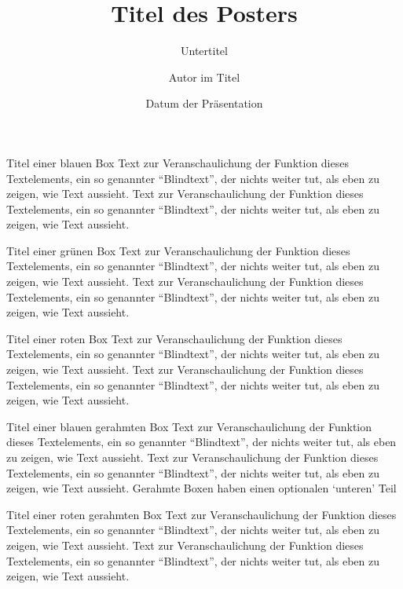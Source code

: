 \documentclass[naustrian,portrait]{univie-ling-poster}
\author[Autor in Fußzeile]{Autor im Titel}
\title{Titel des Posters}
\subtitle{Untertitel}
\date{Datum der Präsentation}
\begin{document}
\begin{frame}

\begin{bluebox}{Titel einer blauen Box}
	Text zur Veranschaulichung der Funktion dieses Textelements, ein so
	genannter \enquote{Blindtext}, der nichts weiter tut, als eben zu zeigen,
	wie Text aussieht. Text zur Veranschaulichung der Funktion dieses Textelements, ein so
	genannter \enquote{Blindtext}, der nichts weiter tut, als eben zu zeigen,
	wie Text aussieht.
\end{bluebox}

\begin{greenbox}{Titel einer grünen Box}
	Text zur Veranschaulichung der Funktion dieses Textelements, ein so
	genannter \enquote{Blindtext}, der nichts weiter tut, als eben zu zeigen,
	wie Text aussieht. Text zur Veranschaulichung der Funktion dieses Textelements, ein so
	genannter \enquote{Blindtext}, der nichts weiter tut, als eben zu zeigen,
	wie Text aussieht.
\end{greenbox}


\begin{redbox}{Titel einer roten Box}
	Text zur Veranschaulichung der Funktion dieses Textelements, ein so
	genannter \enquote{Blindtext}, der nichts weiter tut, als eben zu zeigen,
	wie Text aussieht. Text zur Veranschaulichung der Funktion dieses Textelements, ein so
	genannter \enquote{Blindtext}, der nichts weiter tut, als eben zu zeigen,
	wie Text aussieht.
\end{redbox}

\begin{blueframedbox}{Titel einer blauen gerahmten Box}
	Text zur Veranschaulichung der Funktion dieses Textelements, ein so
	genannter \enquote{Blindtext}, der nichts weiter tut, als eben zu zeigen,
	wie Text aussieht. Text zur Veranschaulichung der Funktion dieses Textelements, ein so
	genannter \enquote{Blindtext}, der nichts weiter tut, als eben zu zeigen,
	wie Text aussieht.
	\tcblower
	Gerahmte Boxen haben einen optionalen \enquote*{unteren} Teil
\end{blueframedbox}

\begin{redframedbox}{Titel einer roten gerahmten Box}
	Text zur Veranschaulichung der Funktion dieses Textelements, ein so
	genannter \enquote{Blindtext}, der nichts weiter tut, als eben zu zeigen,
	wie Text aussieht. Text zur Veranschaulichung der Funktion dieses Textelements, ein so
	genannter \enquote{Blindtext}, der nichts weiter tut, als eben zu zeigen,
	wie Text aussieht.
\end{redframedbox}


\end{frame}
\end{document}
